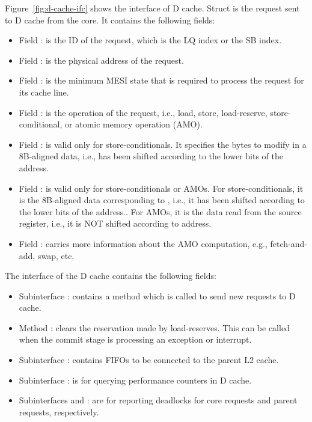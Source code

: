 Figure~\ref{fig:d-cache-ifc} shows the interface of D cache.
Struct  is the request sent to D cache from the core.
It contains the following fields:
\begin{itemize}
    \item Field : is the ID of the request, which is the LQ index or the SB index.
    \item Field : is the physical address of the request.
    \item Field : is the minimum MESI state that is required to process the request for its cache line.
    \item Field : is the operation of the request, i.e., load, store, load-reserve, store-conditional, or atomic memory operation (AMO).
    \item Field : is valid only for store-conditionals.
    It specifies the bytes to modify in a 8B-aligned data, i.e.,  has been shifted according to the lower bits of the address.
    \item Field : is valid only for store-conditionals or AMOs.
    For store-conditionals, it is the 8B-aligned data corresponding to , i.e., it has been shifted according to the lower bits of the address..
    For AMOs, it is the data read from the source register, i.e., it is NOT shifted according to address.
    \item Field : carries more information about the AMO computation, e.g., fetch-and-add, swap, etc.
\end{itemize}
The  interface of the D cache contains the following fields:
\begin{itemize}
    \item Subinterface : contains a  method which is called to send new requests to D cache.
    \item Method : clears the reservation made by load-reserves.
    This can be called when the commit stage is processing an exception or interrupt.
    \item Subinterface : contains FIFOs to be connected to the parent L2 cache.
    \item Subinterface : is for querying performance counters in D cache.
    \item Subinterfaces  and : are for reporting deadlocks for core requests and parent requests, respectively.
\end{itemize}
